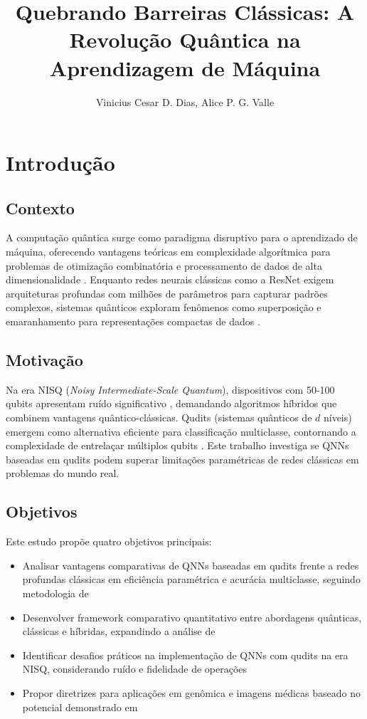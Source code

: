 \documentclass[12pt]{article}
\title{Quebrando Barreiras Clássicas: A Revolução Quântica na Aprendizagem de Máquina}
\author{Vinicius Cesar D. Dias\inst{1}, Alice P. G. Valle\inst{1}}
\begin{document}
 
\maketitle

\section{Introdução}

\subsection{Contexto}
A computação quântica surge como paradigma disruptivo para o aprendizado de máquina, oferecendo vantagens teóricas em complexidade algorítmica para problemas de otimização combinatória e processamento de dados de alta dimensionalidade \cite{Biamonte2017}. Enquanto redes neurais clássicas como a ResNet \cite{He2016} exigem arquiteturas profundas com milhões de parâmetros para capturar padrões complexos, sistemas quânticos exploram fenômenos como superposição e emaranhamento para representações compactas de dados \cite{Cong2018}. 

\subsection{Motivação}
Na era NISQ (\textit{Noisy Intermediate-Scale Quantum}), dispositivos com 50-100 qubits apresentam ruído significativo \cite{Preskill2018}, demandando algoritmos híbridos que combinem vantagens quântico-clássicas. Qudits (sistemas quânticos de $d$ níveis) emergem como alternativa eficiente para classificação multiclasse, contornando a complexidade de entrelaçar múltiplos qubits \cite{Nikolaeva2024}. Este trabalho investiga se QNNs baseadas em qudits podem superar limitações paramétricas de redes clássicas em problemas do mundo real.

\subsection{Objetivos}
Este estudo propõe quatro objetivos principais:
\begin{itemize}
    \item Analisar vantagens comparativas de QNNs baseadas em qudits frente a redes profundas clássicas em eficiência paramétrica e acurácia multiclasse, seguindo metodologia de \cite{Song2024}
    \item Desenvolver framework comparativo quantitativo entre abordagens quânticas, clássicas e híbridas, expandindo a análise de \cite{Zheng2022}
    \item Identificar desafios práticos na implementação de QNNs com qudits na era NISQ, considerando ruído e fidelidade de operações \cite{Benedetti2019}
    \item Propor diretrizes para aplicações em genômica e imagens médicas baseado no potencial demonstrado em \cite{Nikolaeva2024}
\end{itemize}
\end{document}
